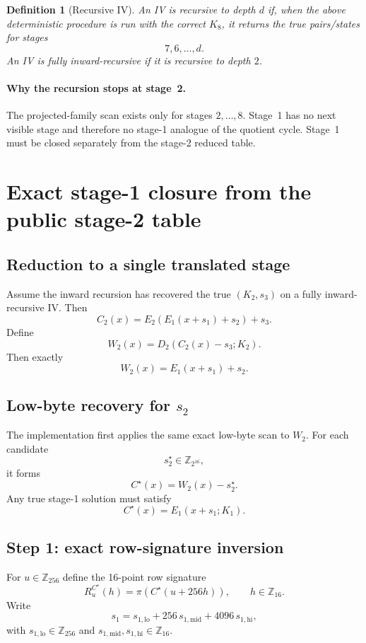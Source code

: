 \documentclass[11pt]{article}
\newtheorem{definition}{Definition}
\newcommand{\Z}[1]{\mathbb{Z}_{#1}}
\begin{document}
\begin{definition}[Recursive IV]
An IV is \emph{recursive to depth $d$} if, when the above deterministic procedure is run with the correct $K_8$, it returns the true pairs/states for stages
\[
7,6,\dots,d.
\]
An IV is \emph{fully inward-recursive} if it is recursive to depth $2$.
\end{definition}

\paragraph{Why the recursion stops at stage~2.}
The projected-family scan exists only for stages $2,\dots,8$. Stage~1 has no next visible stage and therefore no stage-1 analogue of the quotient cycle. Stage~1 must be closed separately from the stage-2 reduced table.

\section{Exact stage-1 closure from the public stage-2 table}
\subsection{Reduction to a single translated stage}
Assume the inward recursion has recovered the true $(K_2,s_3)$ on a fully inward-recursive IV. Then
\[
C_2(x)=E_2(E_1(x+s_1)+s_2)+s_3.
\]
Define
\[
W_2(x)=D_2(C_2(x)-s_3;K_2).
\]
Then exactly
\begin{equation}
\label{eq:stage1-reduction}
W_2(x)=E_1(x+s_1)+s_2.
\end{equation}

\subsection{Low-byte recovery for \texorpdfstring{$s_2$}{s2}}
The implementation first applies the same exact low-byte scan to $W_2$. For each candidate
\[
s_2^\star\in \Z{2^{16}},
\]
it forms
\[
C^\star(x)=W_2(x)-s_2^\star.
\]
Any true stage-1 solution must satisfy
\[
C^\star(x)=E_1(x+s_1;K_1).
\]

\subsection{Step 1: exact row-signature inversion}
For $u\in\Z{256}$ define the 16-point row signature
\[
R_u^{C^\star}(h)=\pi(C^\star(u+256h)),
\qquad h\in\Z{16}.
\]
Write
\[
s_1 = s_{1,\mathrm{lo}} + 256\,s_{1,\mathrm{mid}} + 4096\,s_{1,\mathrm{hi}},
\]
with $s_{1,\mathrm{lo}}\in\Z{256}$ and $s_{1,\mathrm{mid}},s_{1,\mathrm{hi}}\in\Z{16}$.
\end{document}
